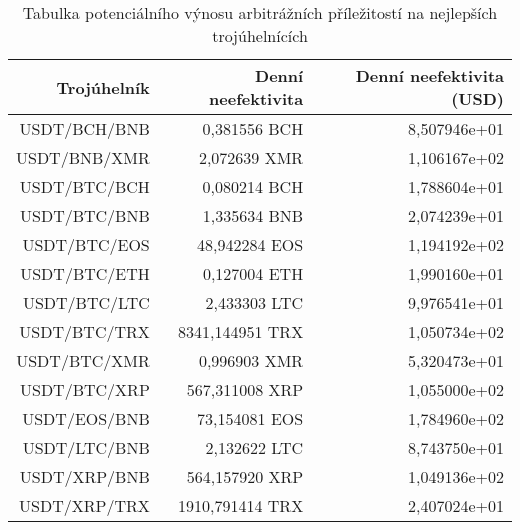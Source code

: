 \begin{table}\centering
\caption{Tabulka potenciálního výnosu arbitrážních příležitostí na nejlepších trojúhelnících}
\label{table_gains_best}
\begin{tabular}{|| r | r | r ||}\hline Trojúhelník & Denní neefektivita & Denní neefektivita (USD)\\
 \hline\hline USDT/BCH/BNB & 0,381556 BCH & 8,507946e+01\\ 
 \hline USDT/BNB/XMR & 2,072639 XMR & 1,106167e+02\\ 
 \hline USDT/BTC/BCH & 0,080214 BCH & 1,788604e+01\\ 
 \hline USDT/BTC/BNB & 1,335634 BNB & 2,074239e+01\\ 
 \hline USDT/BTC/EOS & 48,942284 EOS & 1,194192e+02\\ 
 \hline USDT/BTC/ETH & 0,127004 ETH & 1,990160e+01\\ 
 \hline USDT/BTC/LTC & 2,433303 LTC & 9,976541e+01\\ 
 \hline USDT/BTC/TRX & 8341,144951 TRX & 1,050734e+02\\ 
 \hline USDT/BTC/XMR & 0,996903 XMR & 5,320473e+01\\ 
 \hline USDT/BTC/XRP & 567,311008 XRP & 1,055000e+02\\ 
 \hline USDT/EOS/BNB & 73,154081 EOS & 1,784960e+02\\ 
 \hline USDT/LTC/BNB & 2,132622 LTC & 8,743750e+01\\ 
 \hline USDT/XRP/BNB & 564,157920 XRP & 1,049136e+02\\ 
 \hline USDT/XRP/TRX & 1910,791414 TRX & 2,407024e+01\\ 
 \hline
\end{tabular}
\end{table}